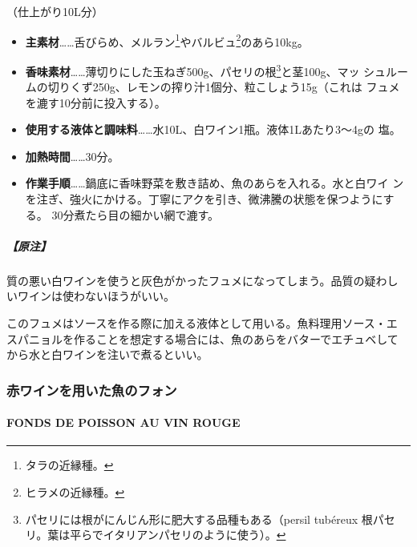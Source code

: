 \begin{recette}
（仕上がり10L分）

\begin{itemize}
\item
  \textbf{主素材}\ldots{}\ldots{}舌びらめ、メルラン\footnote{タラの近縁種。}やバルビュ\footnote{ヒラメの近縁種。}のあら10kg。
\item
  \textbf{香味素材}\ldots{}\ldots{}薄切りにした玉ねぎ500g、パセリの根\footnote{パセリには根がにんじん形に肥大する品種もある（persil
    tubéreux 根パセリ。葉は平らでイタリアンパセリのように使う）。}と茎100g、マッ
  シュルームの切りくず250g、レモンの搾り汁1個分、粒こしょう15g（これは
  フュメを漉す10分前に投入する）。
\item
  \textbf{使用する液体と調味料}\ldots{}\ldots{}水10L、白ワイン1瓶。液体1Lあたり3〜4gの
  塩。
\item
  \textbf{加熱時間}\ldots{}\ldots{}30分。
\item
  \textbf{作業手順}\ldots{}\ldots{}鍋底に香味野菜を敷き詰め、魚のあらを入れる。水と白ワイ
  ンを注ぎ、強火にかける。丁寧にアクを引き、微沸騰の状態を保つようにする。
  30分煮たら目の細かい網で漉す。
\end{itemize}

\hypertarget{ux539fux6ce8-2}{%
\subparagraph{【原注】}\label{ux539fux6ce8-2}}

質の悪い白ワインを使うと灰色がかったフュメになってしまう。品質の疑わし
いワインは使わないほうがいい。

このフュメはソースを作る際に加える液体として用いる。魚料理用ソース・エ
スパニョルを作ることを想定する場合には、魚のあらをバターでエチュベして
から水と白ワインを注いで煮るといい。

\maeaki

\hypertarget{ux8d64ux30efux30a4ux30f3ux3092ux7528ux3044ux305fux9b5aux306eux30d5ux30a9ux30f3}{%
\subsubsection{赤ワインを用いた魚のフォン}\label{ux8d64ux30efux30a4ux30f3ux3092ux7528ux3044ux305fux9b5aux306eux30d5ux30a9ux30f3}}

\hypertarget{fonds-de-poisson-au-vin-rouge}{%
\paragraph{FONDS DE POISSON AU VIN
ROUGE}\label{fonds-de-poisson-au-vin-rouge}}



\end{recette}

